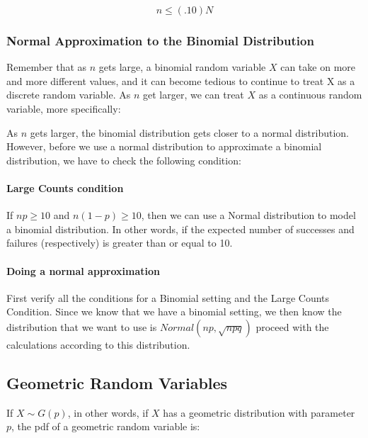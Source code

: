 \documentclass[
]{book}
\theoremstyle{definition}
\theoremstyle{definition}
\theoremstyle{definition}
\theoremstyle{definition}
\theoremstyle{remark}
\begin{document}
\[n \leq (.10) N\]

\hypertarget{normal-approximation-to-the-binomial-distribution}{%
\subsubsection{Normal Approximation to the Binomial Distribution}\label{normal-approximation-to-the-binomial-distribution}}

Remember that as \(n\) gets large, a binomial random variable \(X\) can take
on more and more different values, and it can become tedious to continue
to treat X as a discrete random variable. As \(n\) get larger, we can
treat \(X\) as a continuous random variable, more specifically:

As \(n\) gets larger, the binomial distribution gets closer to a normal
distribution. However, before we use a normal distribution to
approximate a binomial distribution, we have to check the following
condition:

\hypertarget{large-counts-condition}{%
\paragraph{Large Counts condition}\label{large-counts-condition}}

If \(np \geq 10\) and \(n(1-p) \geq 10\), then we can use a Normal
distribution to model a binomial distribution. In other words, if the
expected number of successes and failures (respectively) is greater than
or equal to 10.

\hypertarget{doing-a-normal-approximation}{%
\paragraph{Doing a normal approximation}\label{doing-a-normal-approximation}}

First verify all the conditions for a Binomial setting and the Large
Counts Condition. Since we know that we have a binomial setting, we then
know the distribution that we want to use is \(Normal(np, \sqrt{npq})\) proceed with the calculations according to this distribution.

\hypertarget{geometric-random-variables}{%
\subsection{Geometric Random Variables}\label{geometric-random-variables}}

If \(X \sim G(p)\), in other words, if \(X\) has a geometric distribution
with parameter \(p\), the pdf of a geometric random variable is:
\end{document}
